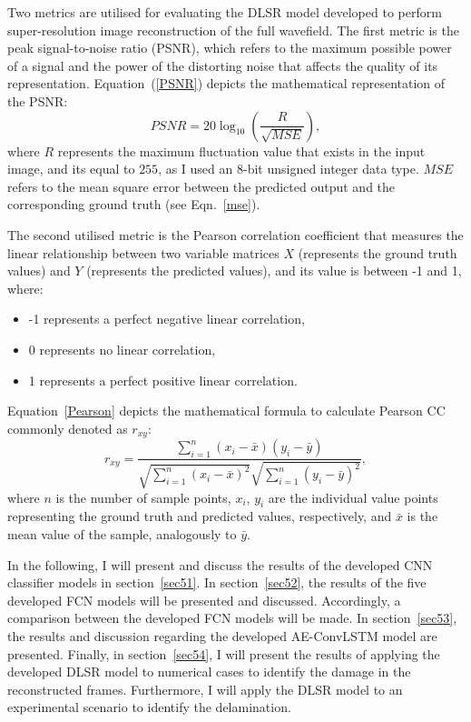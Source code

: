 Two metrics are utilised for evaluating the DLSR model developed to perform super-resolution image reconstruction of the full wavefield.
The first metric is the peak signal-to-noise ratio (PSNR), which refers to the maximum possible power of a signal and the power of the distorting noise that affects the quality of its representation.
Equation~(\ref{PSNR}) depicts the mathematical representation of the PSNR:
\begin{equation}
	PSNR=20\log_{10}\left(\frac{R}{\sqrt{MSE}}\right),
	\label{PSNR}
\end{equation}
where \(R\) represents the maximum fluctuation value that exists in the input image, and its equal to \(255\), as I used an 8-bit unsigned integer data type.
\(MSE\) refers to the mean square error between the predicted output and the corresponding ground truth (see Eqn.~\ref{mse}).

The second utilised metric is the Pearson correlation coefficient that measures the linear relationship between two variable matrices \textbf{\(X\)} (represents the ground truth values) and \textbf{\(Y\)} (represents the predicted values), and its value is between -1 and 1, where:
\begin{itemize}
	\item -1 represents a perfect negative linear correlation,
	\item 0 represents no linear correlation,
	\item 1 represents a perfect positive linear correlation.
\end{itemize}
Equation~\ref{Pearson} depicts the mathematical formula to calculate Pearson CC commonly denoted as \(r_{xy}\):
\begin{equation}
	r_{xy} = \frac{\sum_{i=1}^{n}(x_i - \bar{x})(y_i-\bar{y})}{\sqrt{\sum_{i=1}^{n}(x_i - \bar{x})^2}\sqrt{\sum_{i=1}^{n}(y_i - \bar{y})^2}},
	\label{Pearson}
\end{equation}
where \(n\) is the number of sample points, \(x_i\), \(y_i\) are the individual value points representing the ground truth and predicted values, respectively, and \(\bar{x}\) is the mean value of the sample, analogously to \(\bar{y}\).


In the following, I will present and discuss the results of the developed CNN classifier models in section~\ref{sec51}. 
In section~\ref{sec52}, the results of the five developed FCN models will be presented and discussed.
Accordingly, a comparison between the developed FCN models will be made.
In section~\ref{sec53}, the results and discussion regarding the developed AE-ConvLSTM model are presented.
Finally, in section~\ref{sec54}, I will present the results of applying the developed DLSR model to numerical cases to identify the damage in the reconstructed frames.
Furthermore, I will apply the DLSR model to an experimental scenario to identify the delamination.





